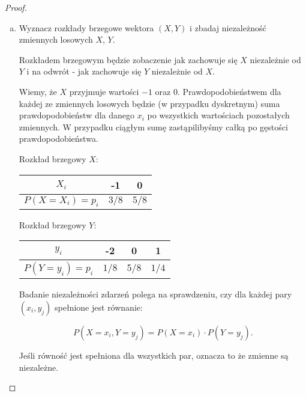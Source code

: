 \documentclass[11pt]{article}
\theoremstyle{definition}
\begin{document}
\begin{proof}

    \begin{enumerate}[a)]
        \item Wyznacz rozkłady brzegowe wektora $(X, Y)$ i zbadaj niezależność zmiennych losowych $X$, $Y$.

              Rozkładem brzegowym będzie zobaczenie jak zachowuje się $X$ niezależnie od $Y$ i na odwrót - jak zachowuje się $Y$ niezależnie od $X$.

              Wiemy, że $X$ przyjmuje wartości $-1$ oraz $0$. Prawdopodobieństwem dla każdej ze zmiennych losowych będzie (w przypadku dyskretnym) suma prawdopodobieństw dla danego $x_i$ po wszystkich wartościach pozostałych zmiennych. W przypadku ciągłym sumę zastąpilibyśmy całką po gęstości prawdopodobieństwa.


              Rozkład brzegowy $X$:
              \begin{table}[ht]
                  \begin{tabular}{|c|c|c|}
                      \hline

                      $X_i$            & -1    & 0     \\
                      \hline
                      $P(X=X_i) = p_i$ & $3/8$ & $5/8$ \\
                      \hline
                  \end{tabular}
              \end{table}

              Rozkład brzegowy $Y$:
              \begin{table}[ht]
                  \begin{tabular}{|c|c|c|c|}
                      \hline
                      $y_i$            & -2    & 0     & 1     \\
                      \hline
                      $P(Y=y_i) = p_i$ & $1/8$ & $5/8$ & $1/4$ \\
                      \hline
                  \end{tabular}
              \end{table}

              Badanie niezależności zdarzeń polega na sprawdzeniu, czy dla każdej pary $(x_i,y_j)$ spełnione jest równanie:

              $$P(X=x_i,Y=y_j) = P(X=x_i)\cdot P(Y=y_j).$$

              Jeśli równość jest spełniona dla wszystkich par, oznacza to że zmienne są niezależne.


\end{enumerate}
\end{proof}
\end{document}
